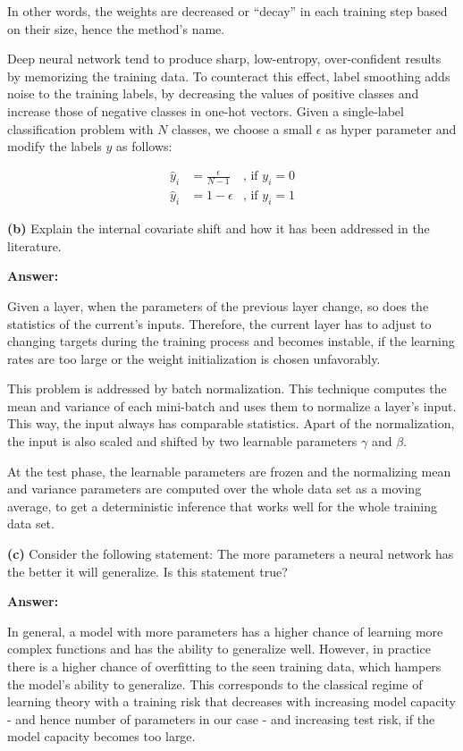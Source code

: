 In other words, the weights are decreased or \enquote{decay} in each training step based on their size, hence the method's name.

Deep neural network tend to produce sharp, low-entropy, over-confident results by memorizing the training data. To counteract this effect, label smoothing adds noise to the training labels, by decreasing the values of positive classes and increase those of negative classes in one-hot vectors. Given a single-label classification problem with $N$ classes, we choose a small $\epsilon$ as hyper parameter and modify the labels $y$ as follows:

\begin{align}
	\hat{y}_i &= \frac{\epsilon}{N-1} &\text{, if } y_i = 0 \\
 	\hat{y}_i &= 1 - \epsilon & \text{, if } y_i = 1
 \end{align}

\textbf{(b)} Explain the internal covariate shift and how it has been addressed in the literature.

\textbf{Answer:}

Given a layer, when the parameters of the previous layer change, so does the statistics of the current's inputs. Therefore, the current layer has to adjust to changing targets during the training process and becomes instable, if the learning rates are too large or the weight initialization is chosen unfavorably. 

This problem is addressed by batch normalization. This technique computes the mean and variance of each mini-batch and uses them to normalize a layer's input. This way, the input always has comparable statistics. Apart of the normalization, the input is also scaled and shifted by two learnable parameters $\gamma$ and $\beta$. 

At the test phase, the learnable parameters are frozen and the normalizing mean and variance parameters are computed over the whole data set as a moving average, to get a deterministic inference that works well for the whole training data set.

\textbf{(c)} Consider the following statement: The more parameters a neural network has the better it will generalize. Is this statement true?

\textbf{Answer:}

In general, a model with more parameters has a higher chance of learning more complex functions and has the ability to generalize well. However, in practice there is a higher chance of overfitting to the seen training data, which hampers the model's ability to generalize. This corresponds to the classical regime of learning theory with a training risk that decreases with increasing model capacity - and hence number of parameters in our case - and increasing test risk, if the model capacity becomes too large. 

